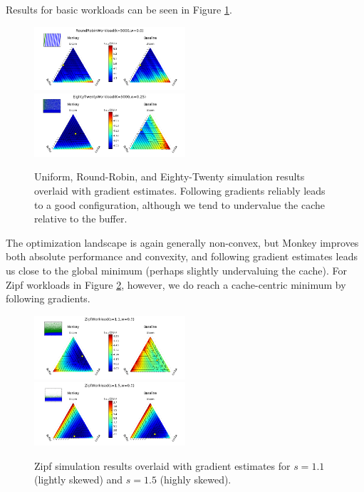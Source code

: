 \documentclass{sig-alternate-05-2015}
\begin{document}
Results for basic workloads can be seen in Figure \ref{fig:basicquiv}.

\begin{figure}[H]
\begin{center}
\includegraphics[width=0.5\textwidth]{robinquiv1.png}
\includegraphics[width=0.5\textwidth]{eightwenquiv1.png}
\end{center}
\caption{Uniform, Round-Robin, and Eighty-Twenty simulation results overlaid with gradient estimates. Following gradients reliably leads to a good configuration, although we tend to undervalue the cache relative to the buffer.}
\label{fig:basicquiv}
\end{figure}

The optimization landscape is again generally non-convex, but Monkey improves both absolute performance and convexity, and following gradient estimates leads us close to the global minimum (perhaps slightly undervaluing the cache). For Zipf workloads in Figure \ref{fig:zipfquiv}, however, we do reach a cache-centric minimum by following gradients.

\begin{figure}[H]
\begin{center}
\includegraphics[width=0.5\textwidth]{zipfquiv1.png}
\includegraphics[width=0.5\textwidth]{zipfquiv2.png}
\end{center}
\caption{Zipf simulation results overlaid with gradient estimates for $s=1.1$ (lightly skewed) and $s=1.5$ (highly skewed).}
\label{fig:zipfquiv}
\end{figure}
\end{document}
